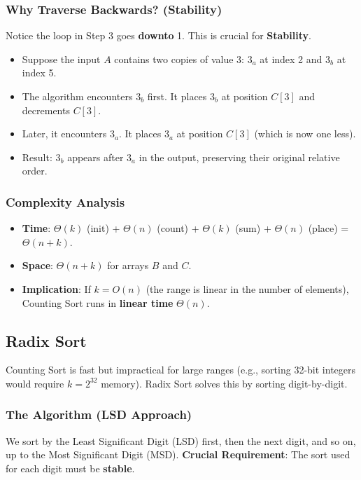 \documentclass[12pt]{article}
\theoremstyle{blueplain}
\theoremstyle{bluedef}
\theoremstyle{blueremark}
\begin{document}
\subsubsection{Why Traverse Backwards? (Stability)}
Notice the loop in Step 3 goes \textbf{downto} 1. This is crucial for \textbf{Stability}.
\begin{itemize}
    \item Suppose the input $A$ contains two copies of value 3: $3_a$ at index 2 and $3_b$ at index 5.
    \item The algorithm encounters $3_b$ first. It places $3_b$ at position $C[3]$ and decrements $C[3]$.
    \item Later, it encounters $3_a$. It places $3_a$ at position $C[3]$ (which is now one less).
    \item Result: $3_b$ appears after $3_a$ in the output, preserving their original relative order.
\end{itemize}

\subsubsection{Complexity Analysis}
\begin{itemize}
    \item \textbf{Time}: $\Theta(k)$ (init) + $\Theta(n)$ (count) + $\Theta(k)$ (sum) + $\Theta(n)$ (place) = $\Theta(n + k)$.
    \item \textbf{Space}: $\Theta(n + k)$ for arrays $B$ and $C$.
    \item \textbf{Implication}: If $k = O(n)$ (the range is linear in the number of elements), Counting Sort runs in \textbf{linear time} $\Theta(n)$.
\end{itemize}

\subsection{Radix Sort}

Counting Sort is fast but impractical for large ranges (e.g., sorting 32-bit integers would require $k=2^{32}$ memory). Radix Sort solves this by sorting digit-by-digit.

\subsubsection{The Algorithm (LSD Approach)}
We sort by the Least Significant Digit (LSD) first, then the next digit, and so on, up to the Most Significant Digit (MSD).
\textbf{Crucial Requirement}: The sort used for each digit must be \textbf{stable}.
\end{document}
